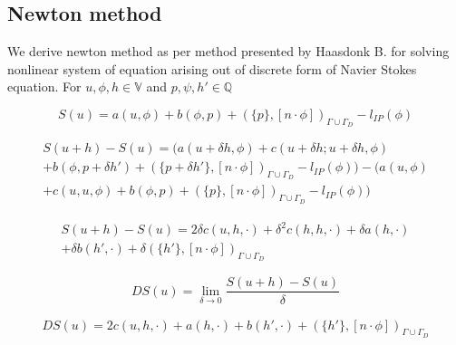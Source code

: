 \documentclass[a4paper]{book}
\begin{document}
\subsection{Newton method} \label{newton_method}

We derive newton method as per method presented by Haasdonk B. \cite{Haasdonk} for solving nonlinear system of equation arising out of discrete form of Navier Stokes equation. For $u, \phi , h \in \mathbb{V}$ and $p, \psi , h' \in \mathbb{Q}$ \\
\begin{flushleft}
\begin{equation}
S(u) = a(u,\phi) + b(\phi,p) + (\{p\},[n\cdot \phi])_{\Gamma \cup \Gamma_D} - l_{IP}(\phi)
\end{equation}
\end{flushleft}

\begin{flushleft}
\begin{equation}
\begin{split}
S(u+h) - S(u) = (a(u+\delta h,\phi) + c(u + \delta h;u + \delta h,\phi)\\ + b(\phi,p+\delta h') + (\{p+\delta h'\},[n\cdot \phi])_{\Gamma \cup \Gamma_D} - l_{IP}(\phi)) - (a(u,\phi)\\ + c(u,u,\phi) + b(\phi,p) + (\{p\},[n\cdot \phi])_{\Gamma \cup \Gamma_D} - l_{IP}(\phi))
\end{split}
\end{equation}
\end{flushleft}

\begin{flushleft}
\begin{equation}
\begin{split}
S(u+h) - S(u) = 2\delta c(u,h,\cdot) + \delta^2 c(h,h,\cdot) + \delta a(h,\cdot)\\ + \delta b(h',\cdot) + \delta (\{h'\},[n\cdot \phi])_{\Gamma \cup \Gamma_D}
\end{split}
\end{equation}
\end{flushleft}

\begin{flushleft}
\begin{equation}
DS(u) = \lim_{\delta \to 0} \frac{S(u+h)-S(u)}{\delta}
\end{equation}
\end{flushleft}

\begin{flushleft}
\begin{equation}
\begin{split}
DS(u) = 2 c(u,h,\cdot) + a(h,\cdot) + b(h',\cdot) + (\{h'\},[n\cdot \phi])_{\Gamma \cup \Gamma_D}
\end{split}
\end{equation}
\end{flushleft}
\end{document}
